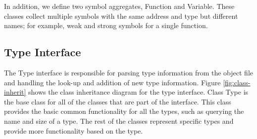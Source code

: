 In addition, we define two symbol aggregates, Function and Variable. These classes collect multiple symbols with the same address and type but different names; for example, weak and strong symbols for a single function. 

\subsection{Type Interface}
\label{subsec:typeInterface}
 The Type interface is responsible for parsing type information from the object file and handling the look-up and addition of new type information. Figure \ref{fig:class-inherit} shows the class inheritance diagram for the type interface. Class Type is the base class for all of the classes that are part of the interface. This class provides the basic common functionality for all the types, such as querying the name and size of a type. The rest of the classes represent specific types and provide more functionality based on the type. 

